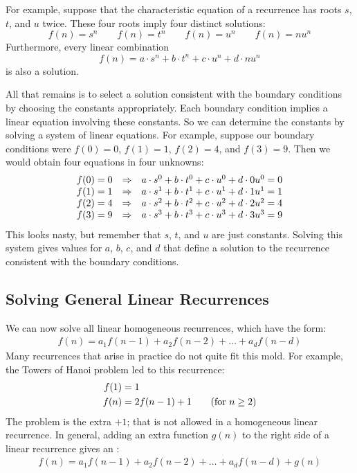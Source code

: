 For example, suppose that the characteristic equation of a
recurrence has roots $s$, $t$, and $u$ twice. These four roots
imply four distinct solutions:
\[
f(n) = s^n \qquad f(n) = t^n \qquad f(n) = u^n \qquad f(n)
  = nu^n
\]
Furthermore, every linear combination
\begin{equation}
f(n) = a \cdot s^n + b \cdot t^n + c \cdot u^n +d \cdot nu^n
\end{equation}
is also a solution.

All that remains is to select a solution consistent with the boundary
conditions by choosing the constants appropriately. Each boundary
condition implies a linear equation involving these constants. So we
can determine the constants by solving a system of linear
equations. For example, suppose our boundary conditions were $f(0) =
0$, $f(1) = 1$, $f(2) = 4$, and $f(3) = 9$.  Then we would obtain four
equations in four unknowns:
\[
\begin{array}{r@{\quad\Rightarrow\quad}l}
f(0) = 0 & a \cdot s^0 + b \cdot t^0 + c \cdot u^0 +d \cdot
0u^0 = 0 \\
f(1) = 1 & a \cdot s^1 + b \cdot t^1 + c \cdot u^1 +d \cdot
1u^1 = 1 \\
f(2) = 4 & a \cdot s^2 + b \cdot t^2 + c \cdot u^2 +d \cdot
2u^2 = 4 \\
f(3) = 9 & a \cdot s^3 + b \cdot t^3 + c \cdot u^3 +d \cdot
3u^3 = 9
\end{array}
\]
This looks nasty, but remember that $s$, $t$, and $u$ are just
constants. Solving this system gives values for $a$, $b$, $c$, and $d$
that define a solution to the recurrence consistent with the boundary
conditions.

\subsection{Solving General Linear Recurrences}

We can now solve all linear homogeneous recurrences, which have the
form:
\begin{align*}
f(n) = a_1 f(n-1) + a_2 f(n-2) + \ldots + a_d f(n - d)
\end{align*}
Many recurrences that arise in practice do not quite fit this mold.
For example, the Towers of Hanoi problem led to this recurrence:
\begin{align*}
f(1) & = 1 \\
f(n) & = 2 f(n - 1) + 1 \text{\qquad (for $n \geq 2$)}
\end{align*}
The problem is the extra $+1$; that is not allowed in a homogeneous
linear recurrence.  In general, adding an extra function $g(n)$ to the
right side of a linear recurrence gives an :
\begin{align*}
f(n) = a_1 f(n-1) + a_2 f(n-2) + \ldots + a_d f(n - d) + g(n)
\end{align*}

